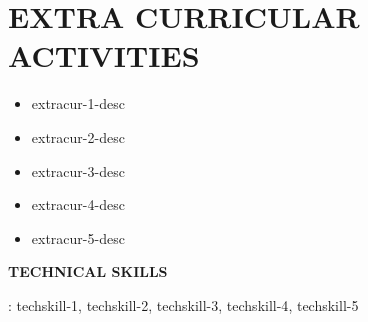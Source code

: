 \documentclass[11pt,usenames,dvipsnames]{article}
\newcommand{\xfilll}[2][1ex]{\hfill}
\begin{document}
{\vspace{-10pt}


\section*{\large \textrm{\textbf{\color{myblue}EXTRA CURRICULAR ACTIVITIES\xfilll[0pt]{0.5pt}}}}
\vspace{-3pt}

\begin{itemize}[label=\textcolor{myblue}{\textbullet},itemsep = -1 mm, leftmargin=6mm]

\item {{{extracur-1-desc}}}
\item {{{extracur-2-desc}}}
\item {{{extracur-3-desc}}}
\item {{{extracur-4-desc}}}
\item {{{extracur-5-desc}}}
\end{itemize}
\vspace{5pt}


\large \textrm{\textbf{\color{myblue}TECHNICAL SKILLS}}} : {{{techskill-1}}}, {{{techskill-2}}}, {{{techskill-3}}}, {{{techskill-4}}}, {{{techskill-5}}}
\end{document}

